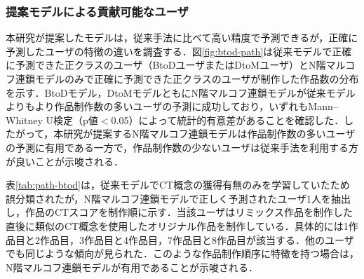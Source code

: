 \documentclass[submit,ses,noauthor]{ipsj}
\begin{document}
\subsubsection{提案モデルによる貢献可能なユーザ}

本研究が提案したモデルは，従来手法に比べて高い精度で予測できるが，正確に予測したユーザの特徴の違いを調査する．図\ref{fig:btod-path}は従来モデルで正確に予測できた正クラスのユーザ（BtoDユーザまたはDtoMユーザ）とN階マルコフ連鎖モデルのみで正確に予測できた正クラスのユーザが制作した作品数の分布を示す．BtoDモデル，DtoMモデルともにN階マルコフ連鎖モデルが従来モデルよりもより作品制作数の多いユーザの予測に成功しており，いずれもMann–Whitney U検定（p値$<$0.05）によって統計的有意差があることを確認した．したがって，本研究が提案するN階マルコフ連鎖モデルは作品制作数の多いユーザの予測に有用である一方で，作品制作数の少ないユーザは従来手法を利用する方が良いことが示唆される．

表\ref{tab:path-btod}は，従来モデルでCT概念の獲得有無のみを学習していたため誤分類されたが，N階マルコフ連鎖モデルで正しく予測されたユーザ1人を抽出し，作品のCTスコアを制作順に示す．当該ユーザはリミックス作品を制作した直後に類似のCT概念を使用したオリジナル作品を制作している．具体的には1作品目と2作品目，3作品目と4作品目，7作品目と8作品目が該当する．他のユーザでも同じような傾向が見られた．このような作品制作順序に特徴を持つ場合は，N階マルコフ連鎖モデルが有用であることが示唆される．



\end{document}
